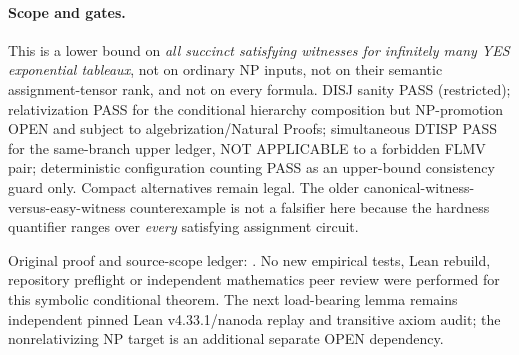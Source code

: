 \documentclass[11pt]{article}
\begin{document}
\paragraph{Scope and gates.}
This is a lower bound on \emph{all succinct satisfying
witnesses for infinitely many YES exponential tableaux},
not on ordinary NP inputs, not on their semantic
assignment-tensor rank, and not on every formula.
DISJ sanity PASS (restricted); relativization
PASS for the conditional hierarchy composition but
NP-promotion OPEN and subject to algebrization/Natural Proofs;
simultaneous DTISP PASS for the same-branch upper ledger,
NOT APPLICABLE to a forbidden FLMV pair;
deterministic configuration counting PASS as an
upper-bound consistency guard only. Compact alternatives
remain legal. The older canonical-witness-versus-easy-witness
counterexample is not a falsifier here because the
hardness quantifier ranges over \emph{every} satisfying
assignment circuit.

Original proof and source-scope ledger:
.
No new empirical tests, Lean rebuild, repository preflight
or independent mathematics peer review were performed for
this symbolic conditional theorem. The next load-bearing
lemma remains independent pinned Lean v4.33.1/nanoda replay
and transitive axiom audit; the nonrelativizing NP target
is an additional separate OPEN dependency.
\end{document}
